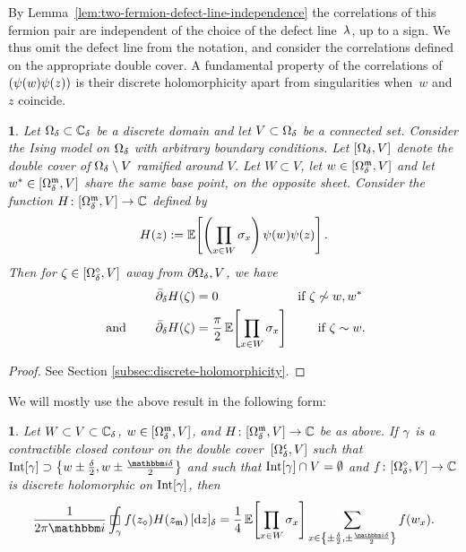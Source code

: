 \documentclass[12pt,oneside,english]{amsart}
\numberwithin{equation}{section}
\numberwithin{figure}{section}
\theoremstyle{plain}
\theoremstyle{plain}
\theoremstyle{plain}
\newtheorem{prop}[thm]{\protect\propositionname}
\theoremstyle{plain}
\theoremstyle{remark}
\theoremstyle{definition}
\theoremstyle{plain}
\newtheorem{cor}[thm]{\protect\corollaryname}
\theoremstyle{plain}
\numberwithin{thm}{section}
\newcommand{\kallemod}[1]{{\color{kallecol} {#1}}}
\providecommand{\corollaryname}{Corollary}
\providecommand{\propositionname}{Proposition}
\providecommand{\corollaryname}{Corollary}
\providecommand{\propositionname}{Proposition}
\providecommand{\corollaryname}{Corollary}
\providecommand{\propositionname}{Proposition}
\providecommand{\corollaryname}{Corollary}
\providecommand{\propositionname}{Proposition}
\begin{document}
By Lemma~\ref{lem:two-fermion-defect-line-independence} the  
correlations of this fermion pair are independent of the choice of the defect 
line~${\lambda}$, up to a sign. We thus omit the defect line from the 
notation, and consider the correlations defined on the appropriate double cover.
A fundamental property of the correlations of
$\left( {\psi}(w)  {\psi}(z)  \right)$
is their discrete holomorphicity apart from singularities when~$w$ and~$z$ 
coincide.
\begin{prop}
\label{prop:discrete-holomorphicity-fermion-correlations}Let ${{\Omega}}_{{\delta}} 
\subset {\mathbb{C}_{{\delta}}}$
be a discrete domain and let $V \subset {{\Omega}}_{{\delta}} $ be a connected set.
Consider the Ising model on ${{\Omega}}_{{\delta}} $ with arbitrary boundary conditions.
Let ${\left[ {{\Omega}}_{{\delta}} , V \right]}$ denote the double cover of ${{\Omega}}_{{\delta}} \setminus V$
ramified around $V$. Let $W \subset V$, let $w \in {\left[ {{\Omega}}_{{\delta}}^{\mathfrak{m}}, V \right]}$
and let $w^{*} \in {\left[ {{\Omega}}_{{\delta}}^{\mathfrak{m}}, V \right]}$ share the same base
point, on the opposite sheet. Consider the function 
$H \colon {\left[ {{\Omega}}_{{\delta}}^{\mathfrak{m}}, V \right]} \to  \mathbb{C} $
defined by 
\[
H(z) :=
  \mathbb{E} \! \left[ { \left(\prod_{x\in W}{\sigma}_{x}\right)
  {\psi}(w) {\psi}(z) } \right] .
\] 
Then for $\zeta \in {\left[ {{\Omega}}_{{\delta}}^{\diamond}, V \right]}$ away from
$\partial{{\Omega}}_{{\delta}} , V$, we 
have
\begin{align*}
{{\bar{\partial}}}_{{\delta}} H(\zeta)
= \; & 0
\qquad\qquad\qquad \text{ if $\zeta\not\sim w,w^{*}$} \\
\text{ and } \qquad
{{\bar{\partial}}}_{{\delta}} H(\zeta) 
= \; & \frac{\pi}{2} \, \mathbb{E} \! \left[ { \prod_{x\in W}{\sigma}_{x} } \right]
\qquad \text{ if $\zeta \sim w$}.
\end{align*}
\end{prop}
\begin{proof}
See Section \ref{subsec:discrete-holomorphicity}. 
\end{proof}
We will mostly use the above result in the following form: 
\begin{cor}
\label{cor:fermion-dance}
Let $W \subset V \subset {\mathbb{C}_{{\delta}}}$, $w \in {\left[ {{\Omega}}_{{\delta}}^{\mathfrak{m}}, V \right]}$, and
$H \colon {\left[ {{\Omega}}_{{\delta}}^{\mathfrak{m}}, V \right]} \to \mathbb{C}$ be as above.
If $\gamma$ is a
contractible closed contour on the double cover~${\left[ {{\Omega}}_{{\delta}}^{\mathfrak{c}}, V \right]}$
such that
$\interior{\contour} \supset
    \set{ w \pm \frac{\meshsz}{2},w\pm\frac{\ii \meshsz }{2} } $
and such that $\mathrm{Int}[{\gamma}] \cap V = \emptyset$ and 
$f \colon {\left[ {{\Omega}}_{{\delta}}^{\diamond}, V \right]} \to  \mathbb{C} $
is discrete holomorphic on $\mathrm{Int}[{\gamma}]$, then 
\[
\frac{1}{2 \pi \ii} 
\dcint{\contour} f(z_{\dmd}) 
  H(z_{\mdl}) \, \dd{z}
= \frac{1}{4} \, \correl{ \prod_{x\in W} \spin_{x} }
  \sum_{x \in \set{\pm\frac{\meshsz}{2},\pm\frac{\ii \meshsz }{2}}} f(w_{x}) .
\]
\end{cor}
\end{document}
